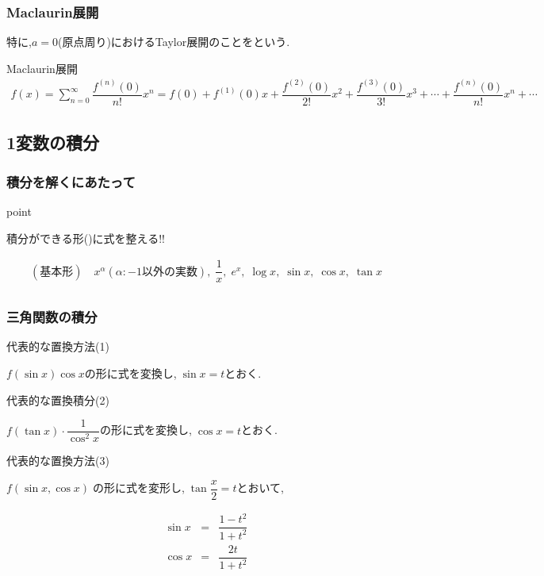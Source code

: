 \documentclass[a4paper]{jsarticle}
\begin{document}
\subsubsection{Maclaurin展開}
特に,$a=0$(原点周り)におけるTaylor展開のことをという.
\begin{itembox}[l]{Maclaurin展開}
    \begin{eqnarray*}
        f\left(x\right)=
        \displaystyle\sum_{n=0}^{\infty}{\dfrac{f^{\left(n\right)}\left(0\right)}{n!}}x^n=
        f\left(0\right)+f^{\left(1\right)}\left(0\right)x
        +\dfrac{f^{\left(2\right)}\left(0\right)}{2!}x^2
        +\dfrac{f^{\left(3\right)}\left(0\right)}{3!}x^3
        +\cdots
        +\dfrac{f^{\left(n\right)}\left(0\right)}{n!}x^n+\cdots
    \end{eqnarray*}
\end{itembox}
\subsection{1変数の積分}
\subsubsection{積分を解くにあたって}
\begin{itembox}[l]{point}
    \begin{center}
        積分ができる形()に式を整える!!\\
    \end{center}
    \begin{eqnarray*}
        (基本形)\quad x^\alpha\!(\alpha:-1以外の実数),\; \dfrac{1}{x},\; e^x,\; \log x,\; \sin x,\; \cos x,\; \tan x\\
    \end{eqnarray*}
\end{itembox}
\subsubsection{三角関数の積分}
\begin{itembox}[l]{代表的な置換方法(1)}
    \begin{center}
        $f\left(\sin x\right)\cos x$の形に式を変換し,$\; \sin x= t$とおく.
    \end{center}
\end{itembox}
\begin{itembox}[l]{代表的な置換積分(2)}
    \begin{center}
        $f\left(\tan x\right)\cdot \dfrac{1}{\cos^2 x}$の形に式を変換し,$\; \cos x= t$とおく.
    \end{center}
\end{itembox}
\begin{itembox}[l]{代表的な置換方法(3)}
    \begin{center}
        $f\left(\sin x,\cos x\right)\;$の形に式を変形し,$\; \tan\dfrac{x}{2}=t$とおいて,
    \end{center}
    \begin{eqnarray*}
        \sin x&=&\dfrac{1-t^2}{1+t^2}\\
        \cos x&=&\dfrac{2t}{1+t^2}\\
    \end{eqnarray*}
\end{itembox}
\end{document}

